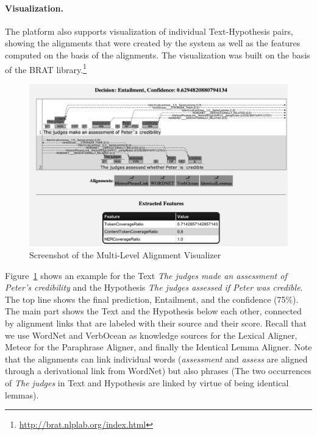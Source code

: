 \documentclass[11pt,letterpaper]{article}
\begin{document}
\paragraph{Visualization.}

The platform also supports visualization of individual Text-Hypothesis
pairs, showing the alignments that were created by the system as well
as the features computed on the basis of the alignments. The
visualization was built on the basis of the BRAT
library.\footnote{\url{http://brat.nlplab.org/index.html}}

\begin{figure}[t]
  \centering
\includegraphics[width=\textwidth]{ScreenshotGray}  
  \caption{Screenshot of the Multi-Level Alignment Visualizer}
  \label{fig:screenshot}
\end{figure}

Figure~\ref{fig:screenshot} shows an example for the Text \textit{The
  judges made an assessment of Peter's credibility} and the Hypothesis
\textit{The judges assessed if Peter was credible}. The top line shows
the final prediction, Entailment, and the confidence (75\%). The main
part shows the Text and the Hypothesis below each other, connected by
alignment links that are labeled with their source and their
score. Recall that we use WordNet and VerbOcean as knowledge sources
for the Lexical Aligner, Meteor for the Paraphrase Aligner, and
finally the Identical Lemma Aligner. Note that the alignments can link
individual words (\textit{assessment} and \textit{assess} are aligned
through a derivational link from WordNet) but also phrases (The two
occurrences of \textit{The judges} in Text and Hypothesis are linked
by virtue of being identical lemmas). 
\end{document}
